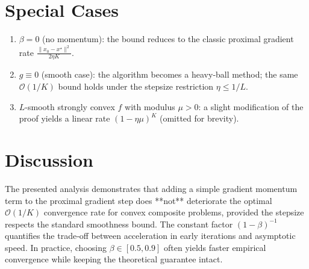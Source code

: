 \documentclass{article}
\begin{document}
\section*{Special Cases}
\begin{enumerate}[leftmargin=*, label=\arabic*.]
\item \(\beta=0\) (no momentum): the bound reduces to the classic proximal gradient rate \(\frac{\|x_0-x^{\star}\|^{2}}{2\eta K}\).
\item \(g\equiv0\) (smooth case): the algorithm becomes a heavy‑ball method; the same \(\mathcal O(1/K)\) bound holds under the stepsize restriction \(\eta\le 1/L\).
\item \(L\)-smooth strongly convex \(f\) with modulus \(\mu>0\): a slight modification of the proof yields a linear rate \( (1-\eta\mu)^{K}\) (omitted for brevity).
\end{enumerate}

\section*{Discussion}
The presented analysis demonstrates that adding a simple gradient momentum term to the proximal gradient step does **not** deteriorate the optimal \(\mathcal O(1/K)\) convergence rate for convex composite problems, provided the stepsize respects the standard smoothness bound. The constant factor \((1-\beta)^{-1}\) quantifies the trade‑off between acceleration in early iterations and asymptotic speed. In practice, choosing \(\beta\in[0.5,0.9]\) often yields faster empirical convergence while keeping the theoretical guarantee intact.
\end{document}
